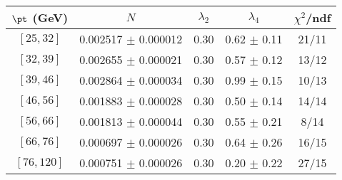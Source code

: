 \begin{tabular}{c||c|c|c|c}
$\pt$ (GeV) & $N$ & $\lambda_{2}$ & $\lambda_4$  & $\chi^2$/ndf  \\
\hline
$[25, 32]$ & 0.002517 $\pm$ 0.000012 & 0.30 & 0.62 $\pm$ 0.11 & 21/11\\
$[32, 39]$ & 0.002655 $\pm$ 0.000021 & 0.30 & 0.57 $\pm$ 0.12 & 13/12\\
$[39, 46]$ & 0.002864 $\pm$ 0.000034 & 0.30 & 0.99 $\pm$ 0.15 & 10/13\\
$[46, 56]$ & 0.001883 $\pm$ 0.000028 & 0.30 & 0.50 $\pm$ 0.14 & 14/14\\
$[56, 66]$ & 0.001813 $\pm$ 0.000044 & 0.30 & 0.55 $\pm$ 0.21 & 8/14\\
$[66, 76]$ & 0.000697 $\pm$ 0.000026 & 0.30 & 0.64 $\pm$ 0.26 & 16/15\\
$[76, 120]$ & 0.000751 $\pm$ 0.000026 & 0.30 & 0.20 $\pm$ 0.22 & 27/15\\
\end{tabular}
